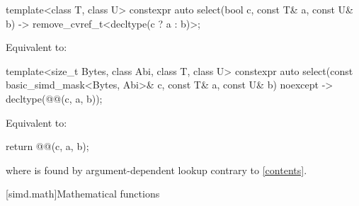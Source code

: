 \begin{itemdecl}
template<class T, class U>
  constexpr auto select(bool c, const T& a, const U& b)
  -> remove_cvref_t<decltype(c ? a : b)>;
\end{itemdecl}

\begin{itemdescr}
\pnum
\effects
Equivalent to: 
\end{itemdescr}

\begin{itemdecl}
template<size_t Bytes, class Abi, class T, class U>
  constexpr auto select(const basic_simd_mask<Bytes, Abi>& c, const T& a, const U& b)
  noexcept -> decltype(@@(c, a, b));
\end{itemdecl}

\begin{itemdescr}
\pnum
\effects
Equivalent to:
\begin{codeblock}
return @@(c, a, b);
\end{codeblock}
where  is found by argument-dependent
lookup contrary to \ref{contents}.
\end{itemdescr}

[simd.math]{Mathematical functions}

